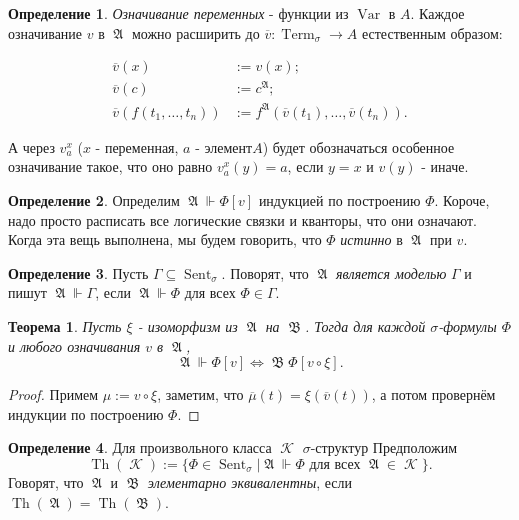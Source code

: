 \documentclass[a4paper,100pt]{article}
\theoremstyle{indented}
\newtheorem{theorem}{Теорема}
\theoremstyle{definition}
\newtheorem{defn}{Определение}
\theoremstyle{remark}
\DeclareMathOperator{\ra}{\rightarrow}
\DeclareMathOperator{\Llra}{\Longleftrightarrow}
\DeclareMathOperator{\KK}{\mathscr{K}}
\DeclareMathOperator{\Var}{Var}
\DeclareMathOperator{\Term}{Term}
\DeclareMathOperator{\Sent}{Sent}
\DeclareMathOperator{\Th}{Th}
\DeclareMathOperator{\GA}{\mathfrak{A}}
\DeclareMathOperator{\GB}{\mathfrak{B}}
\begin{document}
\begin{defn}
  \textit{Означивание переменных} - функции из $\Var$ в $A$. Каждое означивание $v$ в $\GA$ можно расширить до $\overline{v}:\Term_\sigma \ra A$ естественным образом: 

  \begin{equation*}
    \begin{aligned}
      \overline{v}(x) & := v(x); \\ 
      \overline{v}(c) & := c^{\GA}; \\
      \overline{v}(f(t_1, \ldots, t_n)) & := f^{\GA}(\overline{v}(t_1), \ldots, \overline{v}(t_n)).
    \end{aligned}
  \end{equation*}

  А через $v^x_a$  ($x$ - переменная, $a$ - элемент$A$) будет обозначаться особенное означивание такое, что оно равно $v^x_a(y)=a$, если $y=x$ и $v(y)$ - иначе.
\end{defn}

\begin{defn}
  Определим $\GA \Vdash \Phi[v]$ индукцией по построению $\Phi$. Короче, надо просто расписать все логические связки и кванторы, что они означают. Когда эта вещь выполнена, мы будем говорить, что $\Phi$ \textit{истинно} в $\GA$ при $v$. 
\end{defn}

\begin{defn}
  Пусть $\Gamma \subseteq \Sent_\sigma$. Поворят, что $\GA$ \textit{является моделью} $\Gamma$ и пишут $\GA \Vdash \Gamma$, если $\GA \Vdash \Phi$ для всех $\Phi\in \Gamma$. 
\end{defn}

\begin{theorem}
  Пусть $\xi$ - изоморфизм из $\GA$ на $\GB$. Тогда для каждой $\sigma$-формулы $\Phi$ и любого означивания $v$ в $\GA$, 
  \[
    \GA \Vdash \Phi[v] \Llra \GB \Phi[v\circ \xi]. 
  \]
\end{theorem}

\begin{proof}
  Примем $\mu:=v\circ \xi$, заметим, что $\overline{\mu}(t) = \xi (\overline{v}(t))$, а потом провернём индукции по построению $\Phi$. 
\end{proof}

\begin{defn}
  Для произвольного класса $\KK$ $\sigma$-структур Предположим
  \[
    \Th(\KK):=\{\Phi\in \Sent_\sigma |\GA \Vdash \Phi \text{ для всех }\GA \in \KK\}.
  \]
  Говорят, что $\GA$ и $\GB$ \textit{элементарно эквивалентны}, если $\Th(\GA)=\Th(\GB)$. 
\end{defn}
\end{document}
